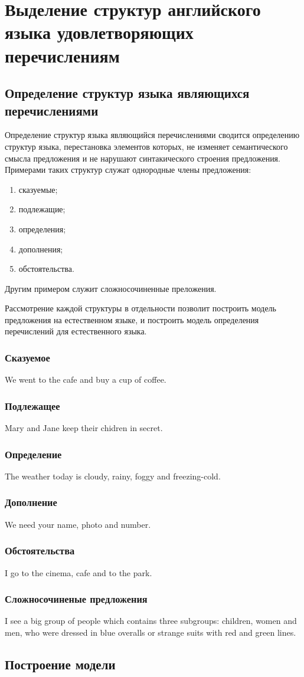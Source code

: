 \documentclass{standalone}
\begin{document}
\chapter{Выделение структур английского языка удовлетворяющих перечислениям}%
\ttl
\section{Определение структур языка являющихся перечислениями}
\par Определение структур языка являющийся перечислениями сводится определению структур языка, перестановка элементов которых, не изменяет семантического смысла предложения и не нарушают синтакического строения предложения. Примерами таких структур служат однородные члены предложения:
\begin{enumerate}
    \item сказуемые;
    \item подлежащие;
    \item определения;
    \item дополнения;
    \item обстоятельства.
\end{enumerate}
\par Другим примером служит сложносочиненные преложения.
\par Рассмотрение каждой структуры в отдельности позволит построить модель предложения на естественном языке, и построить модель определения перечислений для естественного языка.
\subsection{Сказуемое} %
We went to the cafe and buy a cup of coffee.
\subsection{Подлежащее} %
Mary and Jane keep their chidren in secret.
\subsection{Определение} %
The weather today is cloudy, rainy, foggy and freezing-cold.
\subsection{Дополнение} %
We need your name, photo and number.
\subsection{Обстоятельства} %
I go to the cinema, cafe and to the park.
\subsection{Сложносочиненые предложения} %
I see a big group of people which contains three subgroups: children, women and men, who were dressed in blue overalls or strange suits with red and green lines.

\section{Построение модели}
\end{document}
